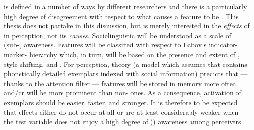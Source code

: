  is defined in a number of ways by different researchers and there is a particularly high degree of disagreement with respect to what causes a feature to be .
This thesis does not partake in this discussion, but is merely interested in the \emph{effects} of  in perception, not its \emph{causes}.
Sociolinguistic  will be understood as a scale of (sub-) awareness.
Features will be classified with respect to Labov's indicator-marker- hierarchy which, in turn, will be based on the presence and extent of , style shifting, and .
For perception,  theory (a model which assumes that  contains phonetically detailed exemplars indexed with social information) predicts that --- thanks to the attention filter ---  features will be stored in memory more often and/or will be more prominent than non- ones.
As a consequence, activation of  exemplars should be easier, faster, and stronger.
It is therefore to be expected that   effects either do not occur at all or are at least considerably weaker when the test variable does not enjoy a high degree of () awareness among perceivers.